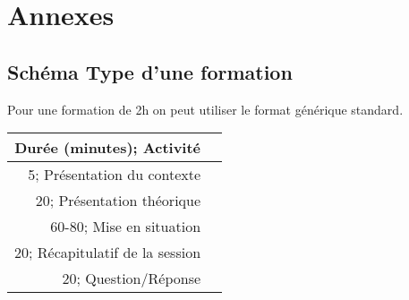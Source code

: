 \section{Annexes}

\subsection{Schéma Type d'une formation}

Pour une formation de 2h on peut utiliser le format générique standard.

\begin{tabular}{|r|l|}
\hline
Durée (minutes); Activité\\
\hline
5; Présentation du contexte\\
\hline
20; Présentation théorique\\
\hline
60-80; Mise en situation\\
\hline
20; Récapitulatif de la session\\
\hline
20; Question/Réponse\\
\hline
\end{tabular}

